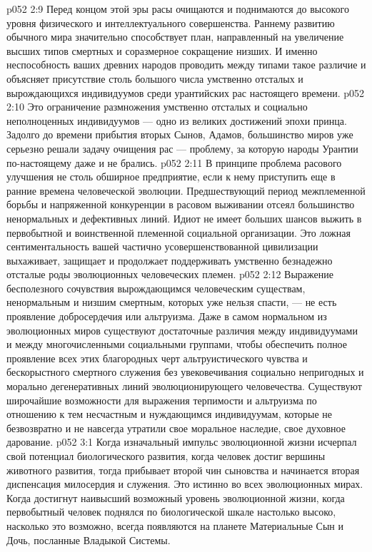 \vs p052 2:9 \pc Перед концом этой эры расы очищаются и поднимаются до высокого уровня физического и интеллектуального совершенства. Раннему развитию обычного мира значительно способствует план, направленный на увеличение высших типов смертных и соразмерное сокращение низших. И именно неспособность ваших древних народов проводить между типами такое различие и объясняет присутствие столь большого числа умственно отсталых и вырождающихся индивидуумов среди урантийских рас настоящего времени.
\vs p052 2:10 Это ограничение размножения умственно отсталых и социально неполноценных индивидуумов --- одно из великих достижений эпохи принца. Задолго до времени прибытия вторых Сынов, Адамов, большинство миров уже серьезно решали задачу очищения рас --- проблему, за которую народы Урантии по\hyp{}настоящему даже и не брались.
\vs p052 2:11 В принципе проблема расового улучшения не столь обширное предприятие, если к нему приступить еще в ранние времена человеческой эволюции. Предшествующий период межплеменной борьбы и напряженной конкуренции в расовом выживании отсеял большинство ненормальных и дефективных линий. Идиот не имеет больших шансов выжить в первобытной и воинственной племенной социальной организации. Это ложная сентиментальность вашей частично усовершенствованной цивилизации выхаживает, защищает и продолжает поддерживать умственно безнадежно отсталые роды эволюционных человеческих племен.
\vs p052 2:12 Выражение бесполезного сочувствия вырождающимся человеческим существам, ненормальным и низшим смертным, которых уже нельзя спасти, --- не есть проявление добросердечия или альтруизма. Даже в самом нормальном из эволюционных миров существуют достаточные различия между индивидуумами и между многочисленными социальными группами, чтобы обеспечить полное проявление всех этих благородных черт альтруистического чувства и бескорыстного смертного служения без увековечивания социально непригодных и морально дегенеративных линий эволюционирующего человечества. Существуют широчайшие возможности для выражения терпимости и альтруизма по отношению к тем несчастным и нуждающимся индивидуумам, которые не безвозвратно и не навсегда утратили свое моральное наследие, свое духовное дарование.
\vs p052 3:1 Когда изначальный импульс эволюционной жизни исчерпал свой потенциал биологического развития, когда человек достиг вершины животного развития, тогда прибывает второй чин сыновства и начинается вторая диспенсация милосердия и служения. Это истинно во всех эволюционных мирах. Когда достигнут наивысший возможный уровень эволюционной жизни, когда первобытный человек поднялся по биологической шкале настолько высоко, насколько это возможно, всегда появляются на планете Материальные Сын и Дочь, посланные Владыкой Системы.
